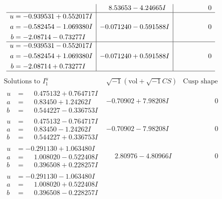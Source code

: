 \documentclass[1p]{elsarticle_modified}
\theoremstyle{definition}
\newcommand{\I}{\sqrt{-1}}
\begin{document}
$$\begin{array}{c|c|c}
 & \phantom{-}8.53653 - 4.24665 I & \phantom{-0.000000 } 0 \\ \hline\begin{aligned}
u &= -0.939531 + 0.552017 I \\
a &= -0.582454 - 1.069380 I \\
b &= -2.08714 - 0.73277 I\end{aligned}
 & -0.071240 - 0.591588 I & \phantom{-0.000000 } 0 \\ \hline\begin{aligned}
u &= -0.939531 - 0.552017 I \\
a &= -0.582454 + 1.069380 I \\
b &= -2.08714 + 0.73277 I\end{aligned}
 & -0.071240 + 0.591588 I & \phantom{-0.000000 } 0\\
 \hline 
 \end{array}$$\newpage$$\begin{array}{c|c|c}  
\text{Solutions to }I^u_{1}& \I (\text{vol} + \sqrt{-1}CS) & \text{Cusp shape}\\
 \hline 
\begin{aligned}
u &= \phantom{-}0.475132 + 0.764717 I \\
a &= \phantom{-}0.83450 + 1.24262 I \\
b &= \phantom{-}0.544227 - 0.336753 I\end{aligned}
 & -0.70902 + 7.98208 I & \phantom{-0.000000 } 0 \\ \hline\begin{aligned}
u &= \phantom{-}0.475132 - 0.764717 I \\
a &= \phantom{-}0.83450 - 1.24262 I \\
b &= \phantom{-}0.544227 + 0.336753 I\end{aligned}
 & -0.70902 - 7.98208 I & \phantom{-0.000000 } 0 \\ \hline\begin{aligned}
u &= -0.291130 + 1.063480 I \\
a &= \phantom{-}1.008020 - 0.522408 I \\
b &= \phantom{-}0.396508 + 0.228257 I\end{aligned}
 & \phantom{-}2.80976 - 4.80966 I & \phantom{-0.000000 } 0 \\ \hline\begin{aligned}
u &= -0.291130 - 1.063480 I \\
a &= \phantom{-}1.008020 + 0.522408 I \\
b &= \phantom{-}0.396508 - 0.228257 I\end{aligned}

\end{array}$$
\end{document}
